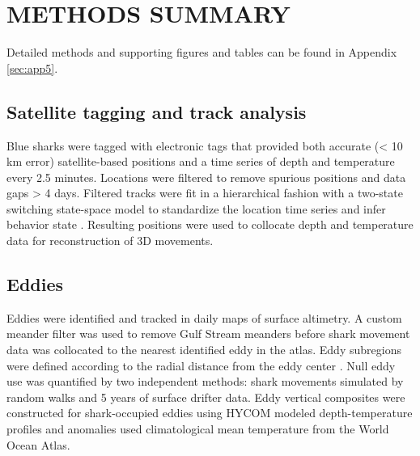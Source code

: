 \section*{METHODS SUMMARY}

Detailed methods and supporting figures and tables can be found in Appendix \ref{sec:app5}.

\subsection*{Satellite tagging and track analysis}
Blue sharks were tagged with electronic tags that provided both accurate (< 10 km error) satellite-based positions and a time series of depth and temperature every 2.5 minutes. Locations were filtered to remove spurious positions and data gaps > 4 days. Filtered tracks were fit in a hierarchical fashion with a two-state switching state-space model to standardize the location time series and infer behavior state \citep{Jonsen2016}. Resulting positions were used to collocate depth and temperature data for reconstruction of 3D movements.

\subsection*{Eddies}
Eddies were identified and tracked in daily maps of surface altimetry. A custom meander filter was used to remove Gulf Stream meanders before shark movement data was collocated to the nearest identified eddy in the atlas. Eddy subregions were defined according to the radial distance from the eddy center \citep{Gaube2017}. Null eddy use was quantified by two independent methods: shark movements simulated by random walks and 5 years of surface drifter data. Eddy vertical composites were constructed for shark-occupied eddies using HYCOM modeled depth-temperature profiles and anomalies used climatological mean temperature from the World Ocean Atlas.

